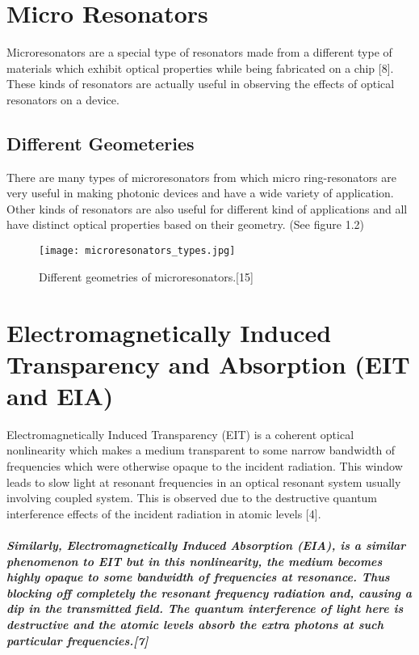 \section{Micro Resonators}
Microresonators are a special type of resonators made from a different type of materials which exhibit optical properties while being fabricated on a chip [8]. These kinds of resonators are actually useful in observing the effects of optical resonators on a device.

\subsection{Different Geometeries}
There are many types of microresonators from which micro ring-resonators are very useful in making photonic devices and have a wide variety of application. Other kinds of resonators are also useful for different kind of applications and all have distinct optical properties based on their geometry. (See figure 1.2)
\begin{figure}[h]
\centering
\texttt{[image: microresonators\_types.jpg]}
\caption{Different geometries of microresonators.[15]}
\end{figure}


\section{Electromagnetically Induced Transparency and Absorption (EIT and EIA)}
Electromagnetically Induced Transparency (EIT) is a coherent optical nonlinearity which makes a medium transparent to some narrow bandwidth of frequencies which were otherwise opaque to the incident radiation. This window leads to slow light at resonant frequencies in an optical resonant system usually involving coupled system. This is observed due to the destructive quantum interference effects of the incident radiation in atomic levels [4].

\subparagraph{\normalfont \large Similarly, Electromagnetically Induced Absorption (EIA), is a similar phenomenon to EIT but in this nonlinearity, the medium becomes highly opaque to some bandwidth of frequencies at resonance. Thus blocking off completely the resonant frequency radiation and, causing a dip in the transmitted field. The quantum interference of light here is destructive and the atomic levels absorb the extra photons at such particular frequencies.[7]}

